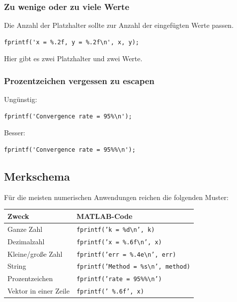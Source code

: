 \documentclass[10pt, letterpaper]{article}
\begin{document}
\subsubsection{Zu wenige oder zu viele Werte}

Die Anzahl der Platzhalter sollte zur Anzahl der eingefügten Werte passen.

\begin{verbatim}
fprintf('x = %.2f, y = %.2f\n', x, y);
\end{verbatim}

Hier gibt es zwei Platzhalter und zwei Werte.

\subsubsection{Prozentzeichen vergessen zu escapen}

Ungünstig:

\begin{verbatim}
fprintf('Convergence rate = 95%\n');
\end{verbatim}

Besser:

\begin{verbatim}
fprintf('Convergence rate = 95%%\n');
\end{verbatim}

\subsection{Merkschema}

Für die meisten numerischen Anwendungen reichen die folgenden Muster:

\begin{center}
\begin{tabular}{ll}
\hline
Zweck & MATLAB-Code \\
\hline
Ganze Zahl & \texttt{fprintf('k = \%d\textbackslash n', k)} \\
Dezimalzahl & \texttt{fprintf('x = \%.6f\textbackslash n', x)} \\
Kleine/große Zahl & \texttt{fprintf('err = \%.4e\textbackslash n', err)} \\
String & \texttt{fprintf('Method = \%s\textbackslash n', method)} \\
Prozentzeichen & \texttt{fprintf('rate = 95\%\%\textbackslash n')} \\
Vektor in einer Zeile & \texttt{fprintf(' \%.6f', x)} \\
\hline
\end{tabular}
\end{center}

\pagebreak
\printbibliography
\end{document}
